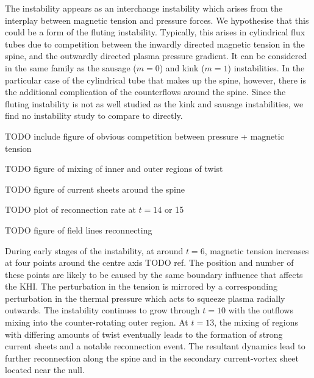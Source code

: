 The instability appears as an interchange instability which arises from the interplay between magnetic tension and pressure forces. We hypothesise that this could be a form of the fluting instability. Typically, this arises in cylindrical flux tubes due to competition between the inwardly directed magnetic tension in the spine, and the outwardly directed plasma pressure gradient. It can be considered in the same family as the sausage ($m=0$) and kink ($m=1$) instabilities. In the particular case of the cylindrical tube that makes up the spine, however, there is the additional complication of the counterflows around the spine. Since the fluting instability is not as well studied as the kink and sausage instabilities, we find no instability study to compare to directly.

TODO include figure of obvious competition between pressure + magnetic tension

TODO figure of mixing of inner and outer regions of twist

TODO figure of current sheets around the spine

TODO plot of reconnection rate at $t=14$ or 15

TODO figure of field lines reconnecting 

During early stages of the instability, at around $t=6$, magnetic tension increases at four points around the centre axis TODO ref. The position and number of these points are likely to be caused by the same boundary influence that affects the KHI. The perturbation in the tension is mirrored by a corresponding perturbation in the thermal pressure which acts to squeeze plasma radially outwards. The instability continues to grow through $t=10$ with the outflows mixing into the counter-rotating outer region. At $t=13$, the mixing of regions with differing amounts of twist eventually leads to the formation of strong current sheets and a notable reconnection event. The resultant dynamics lead to further reconnection along the spine and in the secondary current-vortex sheet located near the null.



